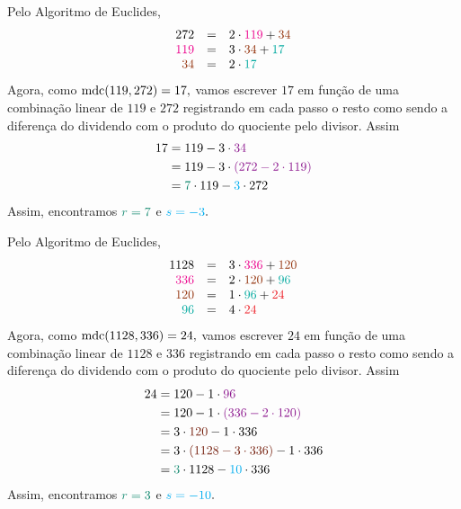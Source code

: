 \documentclass[12pt, a4paper]{article}
\newcommand{\mdc}{{\rm mdc}}
\newcommand{\negrito}[1]{\mbox{\boldmath{$#1$}}}
\newcommand{\alt}[1]{\textcolor{Floresta}{$\negrito{(#1)} $}}
\begin{document}
\begin{solution}
{   \task[\alt{c}] Pelo Algoritmo de Euclides,
\[    \begin{array}{rcl}
    272&=&2 \cdot \textcolor{Magenta}{119} + \textcolor{RawSienna}{34} \\
    \textcolor{Magenta}{119}&=&3 \cdot \textcolor{RawSienna}{34} + \textcolor{Emerald}{17} \\
    \textcolor{RawSienna}{34}&=&2 \cdot \textcolor{Emerald}{17}
    \end{array}
    \]
Agora, como $\mdc(119, 272) = 17,$ vamos escrever $17$ em função de uma combinação linear de $119$ e $272$ registrando em cada passo o resto como sendo a diferença do dividendo com o produto do quociente pelo divisor. Assim
\begin{align*}
    17 &= 119 - 3\cdot \textcolor{Plum}{34}  \\ 
    &= 119 - 3 \cdot \textcolor{Plum}{(272 - 2 \cdot 119)} \\
    &= \textcolor{PineGreen}{7} \cdot 119 - \textcolor{Cyan}{3} \cdot 272 
\end{align*}
Assim, encontramos $\textcolor{PineGreen}{r = 7}$ e $\textcolor{Cyan}{s = -3}.$

   \task[\alt{d}] Pelo Algoritmo de Euclides,
\[    \begin{array}{rcl}
    1128&=&3 \cdot \textcolor{Magenta}{336} + \textcolor{RawSienna}{120} \\
    \textcolor{Magenta}{336}&=&2 \cdot \textcolor{RawSienna}{120} + \textcolor{Emerald}{96} \\
    \textcolor{RawSienna}{120}&=&1 \cdot \textcolor{Emerald}{96} + \textcolor{Red}{24} 
    \\
    \textcolor{Emerald}{96} &=& 4 \cdot \textcolor{Red}{24} 
    \end{array}
    \]
Agora, como $\mdc(1128, 336) = 24,$ vamos escrever $24$ em função de uma combinação linear de $1128$ e $336$ registrando em cada passo o resto como sendo a diferença do dividendo com o produto do quociente pelo divisor. Assim
\begin{align*}
    24 &= 120 - 1\cdot \textcolor{Plum}{96}  \\ 
    &= 120 - 1 \cdot \textcolor{Plum}{(336 - 2 \cdot 120)} \\
    &= 3 \cdot \textcolor{Brown}{120} - 1 \cdot 336 \\
    &= 3 \cdot \textcolor{Brown}{(1128 - 3 \cdot 336)} - 1 \cdot 336 \\
    &= \textcolor{PineGreen}{3} \cdot 1128 - \textcolor{Cyan}{10} \cdot 336
\end{align*}
Assim, encontramos $\textcolor{PineGreen}{r = 3}$ e $\textcolor{Cyan}{s = -10}.$
}
\end{solution}
\end{document}
